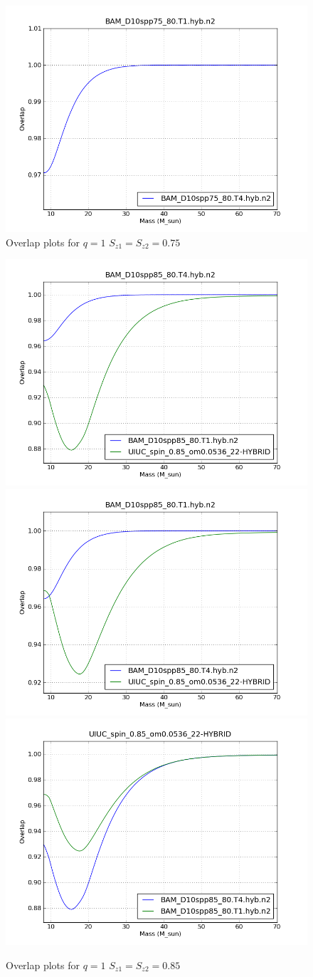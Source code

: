 \begin{figure}
  \includegraphics[width=\linewidth]{figures/ninja2/figure_1_0d75_01.png}
  \caption[Overlap plots for $q=1$ $S_{z1} = S_{z2} = 0.75$]{
  \label{f:figure_1_0d75}
Overlap plots for $q=1$ $S_{z1} = S_{z2} = 0.75$}
\end{figure}%


\begin{figure}
  \includegraphics[width=0.5\linewidth]{figures/ninja2/figure_1_0d85_02.png} 
  \includegraphics[width=0.5\linewidth]{figures/ninja2/figure_1_0d85_04.png} \\
  \includegraphics[width=0.5\linewidth]{figures/ninja2/figure_1_0d85_06.png} 
  \caption[Overlap plots for $q=1$ $S_{z1} = S_{z2} = 0.85$]{
  \label{f:figure_1_0d85}
Overlap plots for $q=1$ $S_{z1} = S_{z2} = 0.85$}
\end{figure}%

